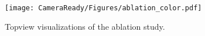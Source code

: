 \begin{figure}
\centering
\texttt{[image: CameraReady/Figures/ablation\_color.pdf]}
\caption{Topview visualizations of the ablation study.}
\label{fig:ablation_topview}
\end{figure}